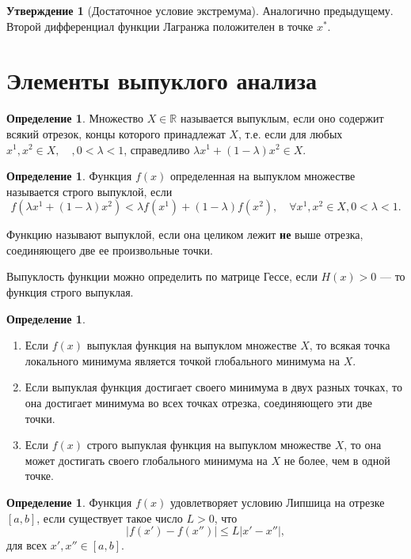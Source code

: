 \documentclass[12pt]{report}
\theoremstyle{definition}
\newtheorem{definition}[theorem]{Определение}
\newtheorem{statement}[theorem]{Утверждение}
\newcommand{\R}{\mathbb R}
\begin{document}
\begin{statement}[Достаточное условие экстремума]
Аналогично предыдущему.
Второй дифференциал функции Лагранжа
положителен в точке $x^*$.
\end{statement}


\section{Элементы выпуклого анализа}

\begin{definition}
Множество $X \in \R$ называется выпуклым, если оно содержит всякий отрезок,
концы которого принадлежат $X$, т.е. если для любых
$x^1, x^2 \in X, \quad, 0 < \lambda < 1$, справедливо
$\lambda x^1 + (1 - \lambda) x^2 \in X$. 
\end{definition}

\begin{definition}
Функция $f(x)$ определенная на выпуклом множестве называется строго выпуклой,
если 
$$
f(\lambda x^1 + (1 - \lambda) x^2) < \lambda f(x^1) + (1 - \lambda) f(x^2),
\quad \forall x^1, x^2 \in X, 0 < \lambda < 1.
$$
\end{definition}

Функцию называют выпуклой, если она целиком лежит {\bf не} выше отрезка,
соединяющего две ее произвольные точки.

Выпуклость функции можно определить по матрице Гессе, если
$H(x) > 0$ --- то функция строго выпуклая.

\begin{definition}
\begin{enumerate}
\item Если $f(x)$ выпуклая функция на выпуклом множестве
$X$, то всякая точка локального минимума является точкой глобального
минимума на $X$.
\item Если выпуклая функция достигает своего минимума в двух разных точках,
то она достигает минимума во всех точках отрезка, соединяющего эти две точки.
\item Если $f(x)$ строго выпуклая функция на выпуклом множестве $X$, то она
может достигать своего глобального минимума на $X$ не более, чем в одной точке.
\end{enumerate}
\end{definition}

\begin{definition}
Функция $f(x)$ удовлетворяет условию Липшица на отрезке
$[a, b]$, если существует такое число $L > 0$, что
$$
|f(x') - f(x'')| \le L|x' - x''|,
$$
для всех $x', x'' \in [a, b]$.
\end{definition}
\end{document}
